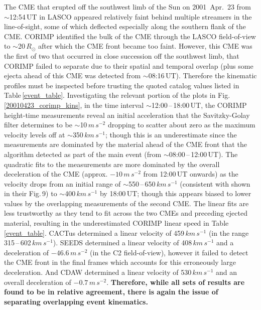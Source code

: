 \documentclass[referee,a4paper,12pt,traditabstract]{swsc}
\begin{document}
\begin{linenumbers}
The CME that erupted off the southwest limb of the Sun on 2001~Apr.~23 from $\sim$12:54\,UT in LASCO appeared relatively faint behind multiple streamers in the line-of-sight, some of which deflected especially along the southern flank of the CME. CORIMP identified the bulk of the CME through the LASCO field-of-view to $\sim$20\,$R_\odot$ after which the CME front became too faint. However, this CME was the first of two that occurred in close succession off the southwest limb, that CORIMP failed to separate due to their spatial and temporal overlap (plus some ejecta ahead of this CME was detected from $\sim$08:16\,UT). Therefore the kinematic profiles must be inspected before trusting the quoted catalog values listed in Table\,\ref{event_table}. Investigating the relevant portion of the plots in Fig.\,\ref{20010423_corimp_kins}, in the time interval $\sim$12:00\,--\,18:00\,UT, the CORIMP height-time measurements reveal an initial acceleration that the Savitzky-Golay filter determines to be $\sim$10\,$m\,s^{-2}$ dropping to scatter about zero as the maximum velocity levels off at $\sim$350\,$km\,s^{-1}$; though this is an underestimate since the measurements are dominated by the material ahead of the CME front that the algorithm detected as part of the main event (from $\sim$08:00\,--\,12:00\,UT). The quadratic fits to the measurements are more dominated by the overall deceleration of the CME (approx. $-10\,m\,s^{-2}$ from 12:00\,UT onwards) as the velocity drops from an initial range of $\sim$550\,--\,650\,$km\,s^{-1}$ (consistent with \citealt{2009A&A...495..325B} shown in their Fig.\,9) to $\sim$400\,$km\,s^{-1}$ by 18:00\,UT; though this appears biased to lower values by the overlapping measurements of the second CME. The linear fits are less trustworthy as they tend to fit across the two CMEs and preceding ejected material, resulting in the underestimated CORIMP linear speed in Table\,\ref{event_table}. CACTus determined a linear velocity of 459$\,km\,s^{-1}$ (in the range 315\,--\,602\,$km\,s^{-1}$). SEEDS determined a linear velocity of 408$\,km\,s^{-1}$ and a deceleration of $-46.6\,m\,s^{-2}$ (in the C2 field-of-view), however it failed to detect the CME front in the final frames which accounts for this erroneously large deceleration. And CDAW determined a linear velocity of 530$\,km\,s^{-1}$ and an overall deceleration of $-0.7\,m\,s^{-2}$. {\bf Therefore, while all sets of results are found to be in relative agreement, there is again the issue of separating overlapping event kinematics.}




\end{linenumbers}
\end{document}

